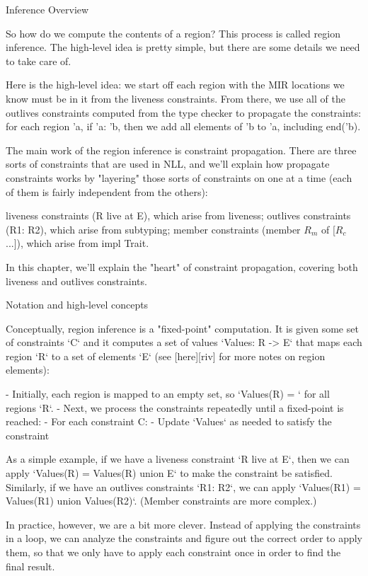 \documentclass[11pt, a4paper]{article}
\begin{document}
Inference Overview

So how do we compute the contents of a region? This process is called region inference. The high-level idea is pretty simple, but there are some details we need to take care of.

Here is the high-level idea: we start off each region with the MIR locations we know must be in it from the liveness constraints. From there, we use all of the outlives constraints computed from the type checker to propagate the constraints: for each region 'a, if 'a: 'b, then we add all elements of 'b to 'a, including end('b).

The main work of the region inference is constraint propagation. There are three sorts of constraints that are used in NLL, and we'll explain how propagate constraints works by "layering" those sorts of constraints on one at a time (each of them is fairly independent from the others):

    liveness constraints (R live at E), which arise from liveness;
    outlives constraints (R1: R2), which arise from subtyping;
    member constraints (member $R_m$ of [$R_c$...]), which arise from impl Trait.

In this chapter, we'll explain the "heart" of constraint propagation, covering both liveness and outlives constraints.

Notation and high-level concepts

Conceptually, region inference is a "fixed-point" computation. It is
given some set of constraints `{C}` and it computes a set of values
`Values: R -> {E}` that maps each region `R` to a set of elements
`{E}` (see [here][riv] for more notes on region elements):

- Initially, each region is mapped to an empty set, so `Values(R) =
  {}` for all regions `R`.
- Next, we process the constraints repeatedly until a fixed-point is reached:
  - For each constraint C:
    - Update `Values` as needed to satisfy the constraint

As a simple example, if we have a liveness constraint `R live at E`,
then we can apply `Values(R) = Values(R) union {E}` to make the
constraint be satisfied. Similarly, if we have an outlives constraints
`R1: R2`, we can apply `Values(R1) = Values(R1) union Values(R2)`.
(Member constraints are more complex.)

In practice, however, we are a bit more clever. Instead of applying
the constraints in a loop, we can analyze the constraints and figure
out the correct order to apply them, so that we only have to apply
each constraint once in order to find the final result.
\end{document}

